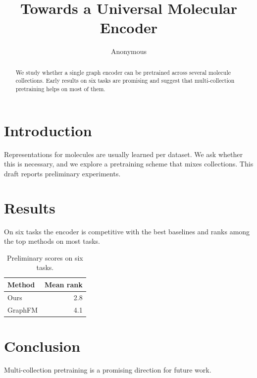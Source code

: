 \documentclass[11pt]{article}
\title{Towards a Universal Molecular Encoder}
\author{Anonymous}
\date{}
\begin{document}
\maketitle
\begin{abstract}
We study whether a single graph encoder can be pretrained across several molecule collections. Early results on
six tasks are promising and suggest that multi-collection pretraining helps on most of them.
\end{abstract}
\section{Introduction}
Representations for molecules are usually learned per dataset. We ask whether this is necessary, and we explore a
pretraining scheme that mixes collections. This draft reports preliminary experiments.
\section{Results}
On six tasks the encoder is competitive with the best baselines and ranks among the top methods on most tasks.
\begin{table}[h]
\centering
\caption{Preliminary scores on six tasks.}\label{tab:bench}
\begin{tabular}{lr}
\toprule
Method & Mean rank \\
\midrule
Ours & 2.8 \\
GraphFM & 4.1 \\
\bottomrule
\end{tabular}
\end{table}
\section{Conclusion}
Multi-collection pretraining is a promising direction for future work.
\end{document}
